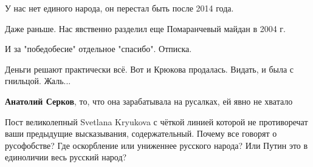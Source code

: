 \begin{itemize}

 
У нас нет единого народа, он перестал быть после 2014 года.

 
Даже раньше. Нас явственно разделил еще Помаранчевый майдан в 2004 г.


 
И за "победобесие" отдельное "спасибо".
Отписка.

 

Деньги решают практически всё. Вот и Крюкова продалась. Видать, и была с
гнильцой. Жаль...

\begin{itemize}
 
\textbf{Анатолий Серков}, то, что она зарабатывала на русалках, ей явно не хватало
\end{itemize}

 

Пост великолепный Svetlana Kryukova с чёткой линией которой не противоречат
ваши предыдущие высказывания, содержательный. Почему все говорят о русофобстве?
Где оскорбление или униженнее русского народа? Или Путин это в единоличии весь
русский народ?



\end{itemize}
